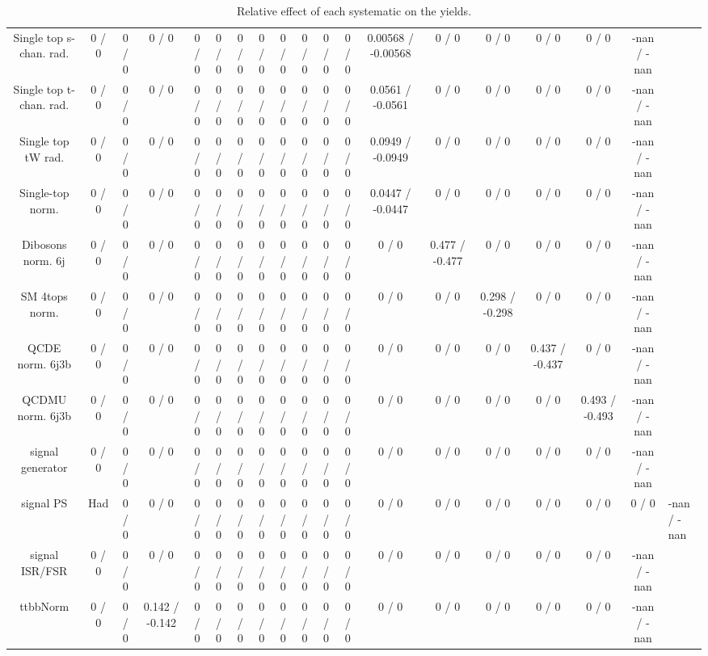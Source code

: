 \documentclass[10pt]{article}
\begin{document}
\begin{table}[htbp]
\begin{center}
\begin{tabular}{|c|c|c|c|c|c|c|c|c|c|c|c|c|c|c|c|c|c|}
  Single top s-chan. rad. & 0 / 0 & 0 / 0 & 0 / 0 & 0 / 0 & 0 / 0 & 0 / 0 & 0 / 0 & 0 / 0 & 0 / 0 & 0 / 0 & 0 / 0 & 0.00568 / -0.00568 & 0 / 0 & 0 / 0 & 0 / 0 & 0 / 0 & -nan / -nan \\ 
  Single top t-chan. rad. & 0 / 0 & 0 / 0 & 0 / 0 & 0 / 0 & 0 / 0 & 0 / 0 & 0 / 0 & 0 / 0 & 0 / 0 & 0 / 0 & 0 / 0 & 0.0561 / -0.0561 & 0 / 0 & 0 / 0 & 0 / 0 & 0 / 0 & -nan / -nan \\ 
  Single top tW rad. & 0 / 0 & 0 / 0 & 0 / 0 & 0 / 0 & 0 / 0 & 0 / 0 & 0 / 0 & 0 / 0 & 0 / 0 & 0 / 0 & 0 / 0 & 0.0949 / -0.0949 & 0 / 0 & 0 / 0 & 0 / 0 & 0 / 0 & -nan / -nan \\ 
  Single-top norm. & 0 / 0 & 0 / 0 & 0 / 0 & 0 / 0 & 0 / 0 & 0 / 0 & 0 / 0 & 0 / 0 & 0 / 0 & 0 / 0 & 0 / 0 & 0.0447 / -0.0447 & 0 / 0 & 0 / 0 & 0 / 0 & 0 / 0 & -nan / -nan \\ 
  Dibosons norm. 6j & 0 / 0 & 0 / 0 & 0 / 0 & 0 / 0 & 0 / 0 & 0 / 0 & 0 / 0 & 0 / 0 & 0 / 0 & 0 / 0 & 0 / 0 & 0 / 0 & 0.477 / -0.477 & 0 / 0 & 0 / 0 & 0 / 0 & -nan / -nan \\ 
  SM 4tops norm. & 0 / 0 & 0 / 0 & 0 / 0 & 0 / 0 & 0 / 0 & 0 / 0 & 0 / 0 & 0 / 0 & 0 / 0 & 0 / 0 & 0 / 0 & 0 / 0 & 0 / 0 & 0.298 / -0.298 & 0 / 0 & 0 / 0 & -nan / -nan \\ 
  QCDE norm. 6j3b & 0 / 0 & 0 / 0 & 0 / 0 & 0 / 0 & 0 / 0 & 0 / 0 & 0 / 0 & 0 / 0 & 0 / 0 & 0 / 0 & 0 / 0 & 0 / 0 & 0 / 0 & 0 / 0 & 0.437 / -0.437 & 0 / 0 & -nan / -nan \\ 
  QCDMU norm. 6j3b & 0 / 0 & 0 / 0 & 0 / 0 & 0 / 0 & 0 / 0 & 0 / 0 & 0 / 0 & 0 / 0 & 0 / 0 & 0 / 0 & 0 / 0 & 0 / 0 & 0 / 0 & 0 / 0 & 0 / 0 & 0.493 / -0.493 & -nan / -nan \\ 
  signal generator & 0 / 0 & 0 / 0 & 0 / 0 & 0 / 0 & 0 / 0 & 0 / 0 & 0 / 0 & 0 / 0 & 0 / 0 & 0 / 0 & 0 / 0 & 0 / 0 & 0 / 0 & 0 / 0 & 0 / 0 & 0 / 0 & -nan / -nan \\ 
  signal PS & Had & 0 / 0 & 0 / 0 & 0 / 0 & 0 / 0 & 0 / 0 & 0 / 0 & 0 / 0 & 0 / 0 & 0 / 0 & 0 / 0 & 0 / 0 & 0 / 0 & 0 / 0 & 0 / 0 & 0 / 0 & 0 / 0 & -nan / -nan \\ 
  signal ISR/FSR & 0 / 0 & 0 / 0 & 0 / 0 & 0 / 0 & 0 / 0 & 0 / 0 & 0 / 0 & 0 / 0 & 0 / 0 & 0 / 0 & 0 / 0 & 0 / 0 & 0 / 0 & 0 / 0 & 0 / 0 & 0 / 0 & -nan / -nan \\ 
 ttbbNorm & 0 / 0 & 0 / 0 & 0.142 / -0.142 & 0 / 0 & 0 / 0 & 0 / 0 & 0 / 0 & 0 / 0 & 0 / 0 & 0 / 0 & 0 / 0 & 0 / 0 & 0 / 0 & 0 / 0 & 0 / 0 & 0 / 0 & -nan / -nan \\ 
\hline 
\end{tabular} 
\caption{Relative effect of each systematic on the yields.} 
\end{center} 
\end{table} 
\end{document}
